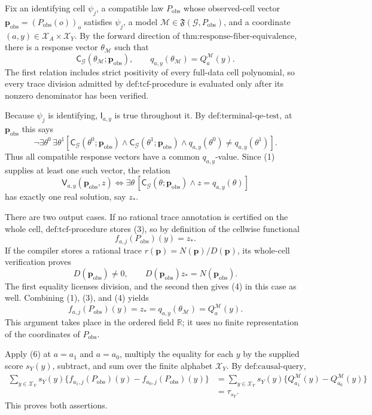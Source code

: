 Fix an identifying cell \(\psi_j\), a compatible law \(P_{\mathrm{obs}}\) whose observed-cell vector \(\mathbf p_{\mathrm{obs}}=(P_{\mathrm{obs}}(o))_o\) satisfies \(\psi_j\), a model \(\mathcal M\in\mathfrak F(\mathcal G,P_{\mathrm{obs}})\), and a coordinate \((a,y)\in\mathcal X_A\times\mathcal X_Y\).  By the forward direction of \(\text{thm:response-fiber-equivalence}\), there is a response vector \(\theta_{\mathcal M}\) such that
\[
\mathsf C_{\mathcal G}(\theta_{\mathcal M};\mathbf p_{\mathrm{obs}}),
\qquad
q_{a,y}(\theta_{\mathcal M})=Q_a^{\mathcal M}(y).
\tag{1}
\]
The first relation includes strict positivity of every full-data cell polynomial, so every trace division admitted by \(\text{def:tcf-procedure}\) is evaluated only after its nonzero denominator has been verified.

Because \(\psi_j\) is identifying, \(\mathsf I_{a,y}\) is true throughout it.  By \(\text{def:terminal-qe-test}\), at \(\mathbf p_{\mathrm{obs}}\) this says
\[
\neg\exists\theta^0\,\exists\theta^1
\left[
\mathsf C_{\mathcal G}(\theta^0;\mathbf p_{\mathrm{obs}})
\wedge
\mathsf C_{\mathcal G}(\theta^1;\mathbf p_{\mathrm{obs}})
\wedge
q_{a,y}(\theta^0)\neq q_{a,y}(\theta^1)
\right].
\tag{2}
\]
Thus all compatible response vectors have a common \(q_{a,y}\)-value.  Since (1) supplies at least one such vector, the relation
\[
\mathsf V_{a,y}(\mathbf p_{\mathrm{obs}},z)
\Longleftrightarrow
\exists\theta\,[\mathsf C_{\mathcal G}(\theta;\mathbf p_{\mathrm{obs}})\wedge z=q_{a,y}(\theta)]
\tag{3}
\]
has exactly one real solution, say \(z_*\).

There are two output cases.  If no rational trace annotation is certified on the whole cell, \(\text{def:tcf-procedure}\) stores (3), so by definition of the cellwise functional
\[
f_{a,j}(P_{\mathrm{obs}})(y)=z_*.
\tag{4}
\]
If the compiler stores a rational trace \(r(\mathbf p)=N(\mathbf p)/D(\mathbf p)\), its whole-cell verification proves
\[
D(\mathbf p_{\mathrm{obs}})\neq0,
\qquad
D(\mathbf p_{\mathrm{obs}})z_*=N(\mathbf p_{\mathrm{obs}}).
\tag{5}
\]
The first equality licenses division, and the second then gives (4) in this case as well.  Combining (1), (3), and (4) yields
\[
f_{a,j}(P_{\mathrm{obs}})(y)
=z_*
=q_{a,y}(\theta_{\mathcal M})
=Q_a^{\mathcal M}(y).
\tag{6}
\]
This argument takes place in the ordered field \(\mathbb R\); it uses no finite representation of the coordinates of \(P_{\mathrm{obs}}\).

Apply (6) at \(a=a_1\) and \(a=a_0\), multiply the equality for each \(y\) by the supplied score \(s_Y(y)\), subtract, and sum over the finite alphabet \(\mathcal X_Y\).  By \(\text{def:causal-query}\),
\[
\begin{aligned}
\sum_{y\in\mathcal X_Y}s_Y(y)
\{f_{a_1,j}(P_{\mathrm{obs}})(y)-f_{a_0,j}(P_{\mathrm{obs}})(y)\}
&=\sum_{y\in\mathcal X_Y}s_Y(y)
\{Q_{a_1}^{\mathcal M}(y)-Q_{a_0}^{\mathcal M}(y)\}\\
&=\tau_{s_Y}.
\end{aligned}
\tag{7}
\]
This proves both assertions.
